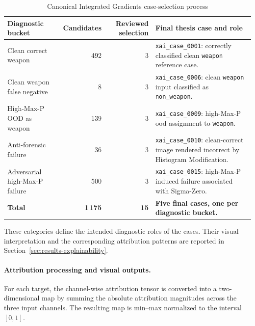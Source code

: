 \begin{table}[H]
\centering
\scriptsize
\renewcommand{\arraystretch}{1.15}
\setlength{\tabcolsep}{4pt}
\caption{Canonical Integrated Gradients case-selection process}
\label{tab:implementation-xai-thesis-selection}
\begin{tabularx}{\textwidth}{@{}p{} r r X@{}}
\toprule
\textbf{Diagnostic bucket} &
\textbf{Candidates} &
\textbf{Reviewed selection} &
\textbf{Final thesis case and role} \\
\midrule

Clean correct weapon
&
492
&
3
&
\texttt{xai\_case\_0001}: correctly classified clean
\texttt{weapon} reference case. \\

Clean weapon false negative
&
8
&
3
&
\texttt{xai\_case\_0006}: clean \texttt{weapon} input classified as
\texttt{non\_weapon}. \\

High-Max-P OOD as weapon
&
139
&
3
&
\texttt{xai\_case\_0009}: high-Max-P \gls{ood} assignment to
\texttt{weapon}. \\

Anti-forensic failure
&
36
&
3
&
\texttt{xai\_case\_0010}: clean-correct image rendered incorrect by
Histogram Modification. \\

Adversarial high-Max-P failure
&
500
&
3
&
\texttt{xai\_case\_0015}: high-Max-P induced failure associated with
Sigma-Zero. \\

\midrule
\textbf{Total}
&
\textbf{1\,175}
&
\textbf{15}
&
\textbf{Five final cases, one per diagnostic bucket.} \\

\bottomrule
\end{tabularx}
\end{table}

These categories define the intended diagnostic roles of the cases. Their
visual interpretation and the corresponding attribution patterns are reported
in Section~\ref{sec:results-explainability}.

\paragraph{Attribution processing and visual outputs.}

For each target, the channel-wise attribution tensor is converted into a
two-dimensional map by summing the absolute attribution magnitudes across the
three input channels. The resulting map is min--max normalized to the interval
\([0,1]\).

